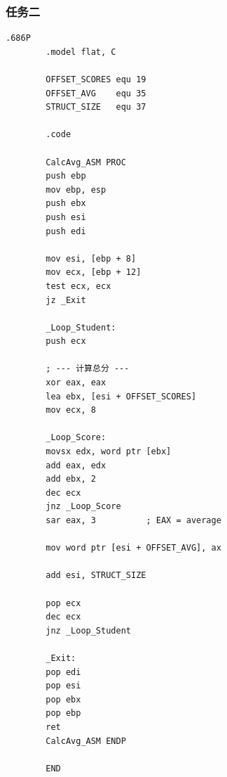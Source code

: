 \documentclass[supercite]{Experimental_Report}
\theoremstyle{definition}
\begin{document}
	\subsubsection{任务二}
	\begin{lstlisting}[style=commonCodeStyle, caption={task2.asm}, label={lst:7-4}]
		.686P             
		.model flat, C  
		
		OFFSET_SCORES equ 19
		OFFSET_AVG    equ 35
		STRUCT_SIZE   equ 37
		
		.code
		
		CalcAvg_ASM PROC
		push ebp
		mov ebp, esp
		push ebx  
		push esi
		push edi
		
		mov esi, [ebp + 8]
		mov ecx, [ebp + 12]
		test ecx, ecx
		jz _Exit
		
		_Loop_Student:
		push ecx        
		
		; --- 计算总分 ---
		xor eax, eax      
		lea ebx, [esi + OFFSET_SCORES]
		mov ecx, 8       
		
		_Loop_Score:
		movsx edx, word ptr [ebx]
		add eax, edx             
		add ebx, 2                
		dec ecx
		jnz _Loop_Score
		sar eax, 3          ; EAX = average
		
		mov word ptr [esi + OFFSET_AVG], ax
		
		add esi, STRUCT_SIZE
		
		pop ecx            
		dec ecx
		jnz _Loop_Student  
		
		_Exit:
		pop edi
		pop esi
		pop ebx
		pop ebp
		ret
		CalcAvg_ASM ENDP
		
		END
		
	\end{lstlisting}
\end{document}
